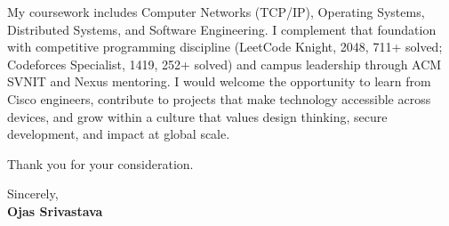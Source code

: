 \documentclass[a4paper,11pt]{article}
\begin{document}
My coursework includes Computer Networks (TCP/IP), Operating Systems, Distributed Systems, and Software Engineering. I complement that foundation with competitive programming discipline (LeetCode Knight, 2048, 711+ solved; Codeforces Specialist, 1419, 252+ solved) and campus leadership through ACM SVNIT and Nexus mentoring. I would welcome the opportunity to learn from Cisco engineers, contribute to projects that make technology accessible across devices, and grow within a culture that values design thinking, secure development, and impact at global scale.

Thank you for your consideration.

Sincerely, \\
\vspace{8mm}
\textbf{Ojas Srivastava}
\end{document}
